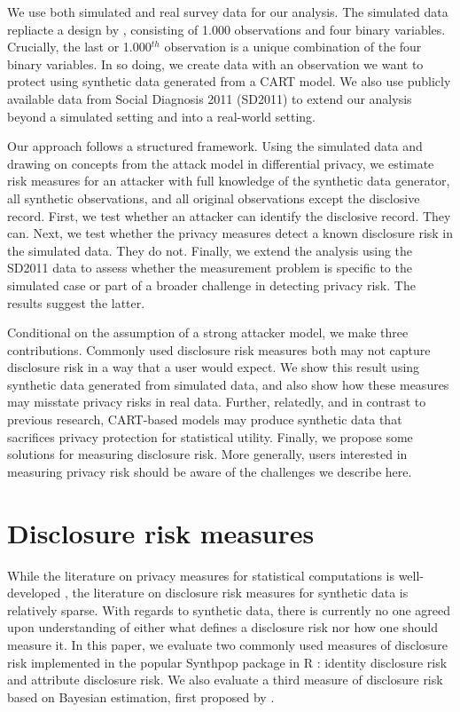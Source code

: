 \documentclass[a4paper,11pt]{style/uneceart}
\begin{document}
We use both simulated and real survey data for our analysis. The simulated data repliacte a design by \citet{reiter2014bayesian}, consisting of 1.000 observations and four binary variables. Crucially, the last or 1.000$^{th}$ observation is a unique combination of the four binary variables.  In so doing, we create data with an observation we want to protect using synthetic data generated from a CART model.  We also use publicly available data from Social Diagnosis 2011 (SD2011) to extend our analysis beyond a simulated setting and into a real-world setting.

Our approach follows a structured framework. Using the simulated data and drawing on concepts from the attack model in differential privacy, we estimate risk measures for an attacker with full knowledge of the synthetic data generator, all synthetic observations, and all original observations except the disclosive record.  First, we test whether an attacker can identify the disclosive record.  They can.  Next, we test whether the privacy measures detect a known disclosure risk in the simulated data. They do not.  Finally, we extend the analysis using the SD2011 data to assess whether the measurement problem is specific to the simulated case or part of a broader challenge in detecting privacy risk. The results suggest the latter.

Conditional on the assumption of a strong attacker model, we make three contributions.  Commonly used disclosure risk measures both may not capture disclosure risk in a way that a user would expect. We show this result using synthetic data generated from simulated data, and also show how these measures may misstate privacy risks in real data.  Further, relatedly, and in contrast to previous research, CART-based models may produce synthetic data that sacrifices privacy protection for statistical utility.  Finally, we propose some solutions for measuring disclosure risk.  More generally, users interested in measuring privacy risk should be aware of the challenges we describe here.

\section{Disclosure risk measures}

While the literature on privacy measures for statistical computations is well-developed \citep{wagner2018technical}, the literature on disclosure risk measures for synthetic data is relatively sparse.  With regards to synthetic data, there is currently no one agreed upon understanding of either what defines a disclosure risk nor how one should measure it. In this paper, we evaluate two commonly used measures of disclosure risk implemented in the popular Synthpop package \citep{nowok2016synthpop} in R  \citep{raab2025practicalprivacymetricssynthetic}: identity disclosure risk and attribute disclosure risk.  
We also evaluate a third measure of disclosure risk based on Bayesian estimation, first proposed by \citet{reiter2014bayesian}.
\end{document}
